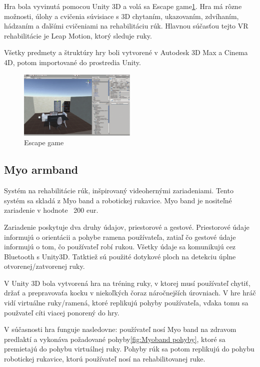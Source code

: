 \documentclass[10pt,twoside,slovak,a4paper]{article}
\begin{document}
Hra bola vyvinutá  pomocou Unity 3D a volá sa Escape game\ref{fig:LeapMotion escape game}. Hra má rôzne možnosti, úlohy a cvičenia súvisiace s 3D chytaním, ukazovaním, zdvíhaním, hádzaním a ďalšími cvičeniami na rehabilitáciu rúk. Hlavnou súčasťou tejto VR rehabilitácie je Leap Motion, ktorý sleduje ruky. 

Všetky predmety a štruktúry hry boli vytvorené v Autodesk 3D Max a Cinema 4D, potom importované do prostredia Unity.\cite{7926560}

\begin{figure}
    \centering
    \includegraphics[width = 0.5\textwidth]{obrazky/Escape game.png}
    \caption{Escape game}
    \label{fig:LeapMotion escape game}
\end{figure}

\subsection{Myo armband}
Systém na rehabilitácie rúk, inšpirovaný videohernými zariadeniami. Tento systém sa skladá z Myo band a robotickej rukavice. Myo band je nositeľné zariadenie v hodnote ~200 eur.

Zariadenie poskytuje dva druhy údajov, priestorové a gestové. 
Priestorové údaje informujú o orientácii a pohybe ramena používateľa, zatiaľ čo gestové údaje informujú o tom, čo používateľ robí rukou. Všetky údaje sa komunikujú cez Bluetooth s Unity3D. Tatktiež sú použité dotykové ploch  na detekciu úplne otvorenej/zatvorenej ruky.

V Unity 3D bola vytvorená hra na tréning ruky, v ktorej musí používateľ chytiť, držať a prepravovaťa kocku v niekoľkých čoraz náročnejších úrovniach. V hre hráč vidí virtuálne ruky/ramená, ktoré replikujú pohyby používateľa, vďaka tomu sa použvateľ cíti viacej ponorený do hry. 

V súčasnosti hra funguje nasledovne: používateľ nosí Myo band na zdravom predlaktí a vykonáva požadované pohyby\ref{fig:Myoband pohyby}, ktoré sa premietajú do pohybu virtuálnej ruky.
Pohyby rúk sa potom replikujú  do pohybu robotickej rukavice, ktorú používateľ nosí na rehabilitovanej ruke. 
 
\end{document}
